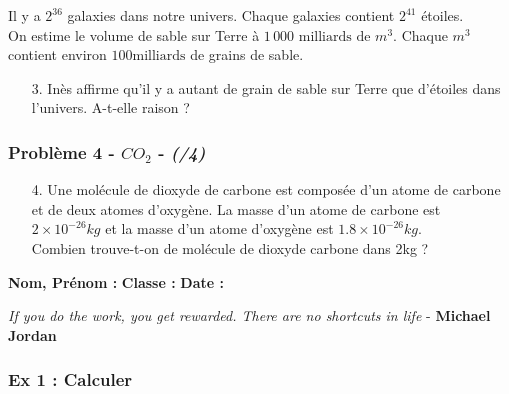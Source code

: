 Il y a $2^{36}$ galaxies dans notre univers. Chaque galaxies contient $2^{41}$ étoiles.  \\
On estime le volume de sable sur Terre à $1\,000 \text{ milliards de } m^3$. Chaque $m^3$ contient environ $100 \text{milliards}$ de grains de sable. 

\begin{itemize}
\item[3.] Inès affirme qu'il y a autant de grain de sable sur Terre que d'étoiles dans l'univers. A-t-elle raison ? 
\end{itemize}


\subsubsection*{Problème 4 - $CO_2$  - \textit{(/4)}}

\begin{enumerate}
  \item[4.] Une molécule de dioxyde de carbone est composée d'un atome de carbone et de deux atomes d'oxygène. La masse d'un atome de carbone est $2 \times 10^{-26}kg$ et la masse d'un atome d'oxygène est $1.8 \times 10^{-26}kg$. \\
  Combien trouve-t-on de molécule de dioxyde carbone dans 2kg ?
\end{enumerate}


\newpage



\textbf{Nom, Prénom :} \hspace{8cm} \textbf{Classe :} \hspace{3cm} \textbf{Date :}\\

\begin{center}
  \textit{If you do the work, you get rewarded. There are no shortcuts in life}  - \textbf{Michael Jordan}
\end{center}

\subsubsection*{Ex 1 : Calculer}

